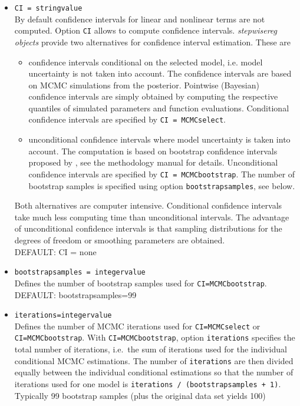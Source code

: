 \begin{itemize}
\item {\tt CI = stringvalue} \\
By default confidence intervals for linear and nonlinear terms are not computed. Option {\tt CI} allows to compute confidence intervals. {\em stepwisereg objects}
provide two alternatives for confidence interval estimation. These are
\begin{itemize}
\item confidence intervals conditional on the selected model, i.e. model uncertainty is not taken into account. The confidence intervals are
based on MCMC simulations from the posterior. Pointwise (Bayesian) confidence intervals are simply obtained by computing the respective
quantiles of simulated parameters and function evaluations. Conditional confidence intervals are specified by {\tt CI = MCMCselect}.
\item unconditional confidence intervals where model uncertainty is taken into account. The computation is based on
    bootstrap confidence intervals proposed by , see the methodology manual for details.
    Unconditional confidence intervals are specified by {\tt CI = MCMCbootstrap}. The number of bootstrap samples is
    specified using option {\tt bootstrapsamples}, see below.
\end{itemize}
Both alternatives are computer intensive. Conditional confidence intervals take much less computing time than unconditional intervals. The advantage of
unconditional confidence intervals is that sampling distributions for the degrees of freedom or smoothing parameters are obtained. \\
DEFAULT: CI = none
\item {\tt bootstrapsamples = integervalue} \\
Defines the number of bootstrap samples used for {\tt CI=MCMCbootstrap}. \\
DEFAULT: bootstrapsamples=99
\item {\tt iterations=integervalue} \\
 Defines the number of MCMC iterations used for {\tt CI=MCMCselect} or
{\tt CI=MCMCbootstrap}. With {\tt CI=MCMCbootstrap}, option {\tt iterations} specifies the total number
of iterations, i.e.~the sum of iterations used for the individual conditional MCMC estimations.
The number of  {\tt iterations} are then divided equally between the individual conditional estimations so that the number of iterations
used for one model is {\tt iterations / (bootstrapsamples + 1)}. Typically 99 bootstrap samples (plus the original data set yields 100)

\end{itemize}
